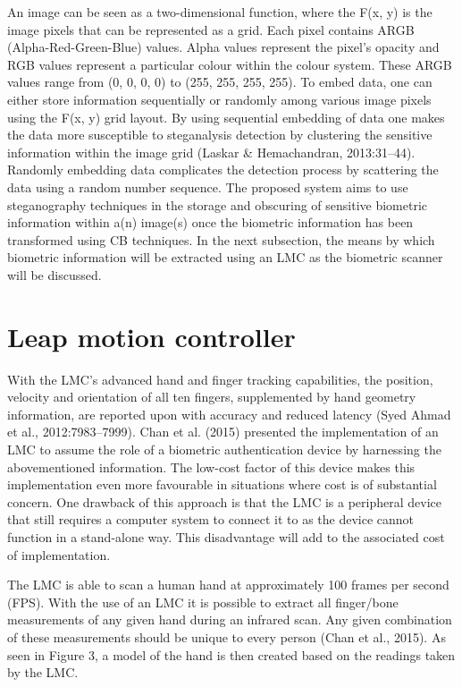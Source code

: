 An image can be seen as a two-dimensional function, where the F(x, y) is the image pixels that can be represented as a grid. Each pixel contains ARGB (Alpha-Red-Green-Blue) values. Alpha values represent the pixel’s opacity and RGB values represent a particular colour within the colour system. These ARGB values range from (0, 0, 0, 0) to (255, 255, 255, 255). To embed data, one can either store information sequentially or randomly among various image pixels using the F(x, y) grid layout. By using sequential embedding of data one makes the data more susceptible to steganalysis detection by clustering the sensitive information within the image grid (Laskar \& Hemachandran, 2013:31–44). Randomly embedding data complicates the detection process by scattering the data using a random number sequence. The proposed system aims to use steganography techniques in the storage and obscuring of sensitive biometric information within a(n) image(s) once the biometric information has been transformed using CB techniques. In the next subsection, the means by which biometric information will be extracted using an LMC as the biometric scanner will be discussed.


\section[Leap motion controller ]{Leap motion controller }

With the LMC’s advanced hand and finger tracking capabilities, the position, velocity and orientation of all ten fingers, supplemented by hand geometry information, are reported upon with accuracy and reduced latency (Syed Ahmad et al., 2012:7983–7999). Chan et al. (2015)  presented the implementation of an LMC to assume the role of a biometric authentication device by harnessing the abovementioned information. The low-cost factor of this device makes this implementation even more favourable in situations where cost is of substantial concern. One drawback of this approach is that the LMC is a peripheral device that still requires a computer system to connect it to as the device cannot function in a stand-alone way. This disadvantage will add to the associated cost of implementation.

The LMC is able to scan a human hand at approximately 100 frames per second (FPS). With the use of an LMC it is possible to extract all finger/bone measurements of any given hand during an infrared scan. Any given combination of these measurements should be unique to every person (Chan et al., 2015). As seen in Figure 3, a model of the hand is then created based on the readings taken by the LMC.

